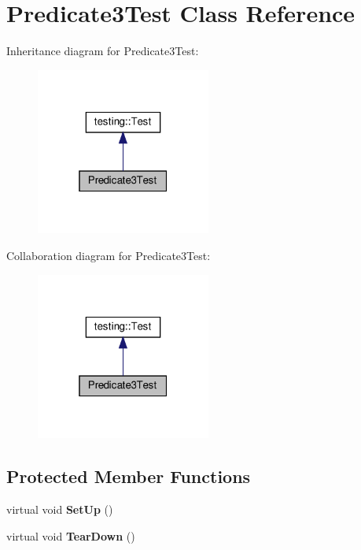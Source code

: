 \hypertarget{class_predicate3_test}{}\section{Predicate3\+Test Class Reference}
\label{class_predicate3_test}


Inheritance diagram for Predicate3\+Test\+:
\nopagebreak
\begin{figure}[H]
\begin{center}
\leavevmode
\includegraphics[width=163pt]{class_predicate3_test__inherit__graph}
\end{center}
\end{figure}


Collaboration diagram for Predicate3\+Test\+:
\nopagebreak
\begin{figure}[H]
\begin{center}
\leavevmode
\includegraphics[width=163pt]{class_predicate3_test__coll__graph}
\end{center}
\end{figure}
\subsection*{Protected Member Functions}
\begin{DoxyCompactItemize}
\item 
\mbox{\label{class_predicate3_test_a92aad9566e0737b6739d1db14e7912be}} 
virtual void {\bfseries Set\+Up} ()
\item 
\mbox{\label{class_predicate3_test_aa4dc395bded849b6e5175566d791aba7}} 
virtual void {\bfseries Tear\+Down} ()
\end{DoxyCompactItemize}
